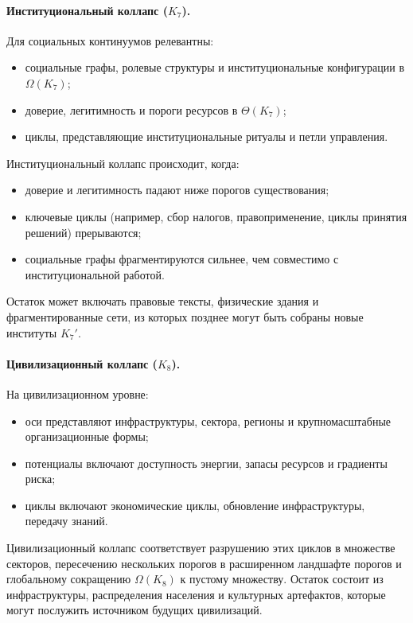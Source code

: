 \paragraph{Институциональный коллапс (\texorpdfstring{\(K_7\)}{K_7}).}
Для социальных континуумов релевантны:
\begin{itemize}
  \item социальные графы, ролевые структуры и институциональные конфигурации в
        \(\Omega(K_7)\);
  \item доверие, легитимность и пороги ресурсов в \(\Theta(K_7)\);
  \item циклы, представляющие институциональные ритуалы и петли управления.
\end{itemize}
Институциональный коллапс происходит, когда:
\begin{itemize}
  \item доверие и легитимность падают ниже порогов существования;
  \item ключевые циклы (например, сбор налогов, правоприменение,
        циклы принятия решений) прерываются;
  \item социальные графы фрагментируются сильнее, чем совместимо с
        институциональной работой.
\end{itemize}
Остаток может включать правовые тексты, физические здания и фрагментированные
сети, из которых позднее могут быть собраны новые институты \(K_7'\).

\paragraph{Цивилизационный коллапс (\texorpdfstring{\(K_8\)}{K_8}).}
На цивилизационном уровне:
\begin{itemize}
  \item оси представляют инфраструктуры, сектора, регионы и крупномасштабные
        организационные формы;
  \item потенциалы включают доступность энергии, запасы ресурсов и градиенты
        риска;
  \item циклы включают экономические циклы, обновление инфраструктуры,
        передачу знаний.
\end{itemize}
Цивилизационный коллапс соответствует разрушению этих циклов в множестве
секторов, пересечению нескольких порогов в расширенном ландшафте порогов и
глобальному сокращению \(\Omega(K_8)\) к пустому множеству. Остаток
состоит из инфраструктуры, распределения населения и культурных артефактов,
которые могут послужить источником будущих цивилизаций.

